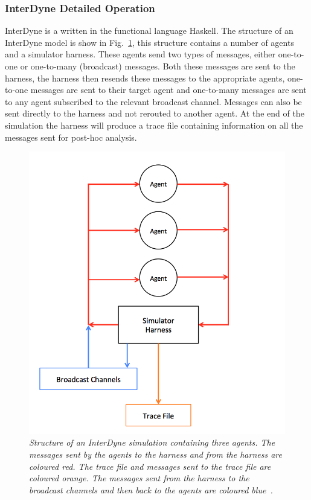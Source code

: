 \documentclass{article}
\begin{document}
\subsubsection{InterDyne Detailed Operation}
InterDyne is a written in the functional language Haskell. The structure of an InterDyne model is show in Fig.~\ref{fig:harness_setupfigure}, this structure contains a number of agents and a simulator harness. These agents send two types of messages, either one-to-one or one-to-many (broadcast) messages. Both these messages are sent to the harness, the harness then resends these messages to the appropriate agents, one-to-one messages are sent to their target agent and one-to-many messages are sent to any agent subscribed to the relevant broadcast channel. Messages can also be sent directly to the harness and not rerouted to another agent. At the end of the simulation the harness will produce a trace file containing information on all the messages sent for post-hoc analysis.    
\begin{figure}[H]
	\centering
	\includegraphics[scale=0.5]{harness_setup}
	\caption{\it Structure of an InterDyne simulation containing three agents. The messages sent by the agents to the harness and from the harness are coloured red. The trace file and messages sent to the trace file are coloured orange. The messages sent from the harness to the broadcast channels and then back to the agents are coloured blue~\cite{interdynemanual}.}
	\label{fig:harness_setupfigure}
\end{figure} 
\end{document}
